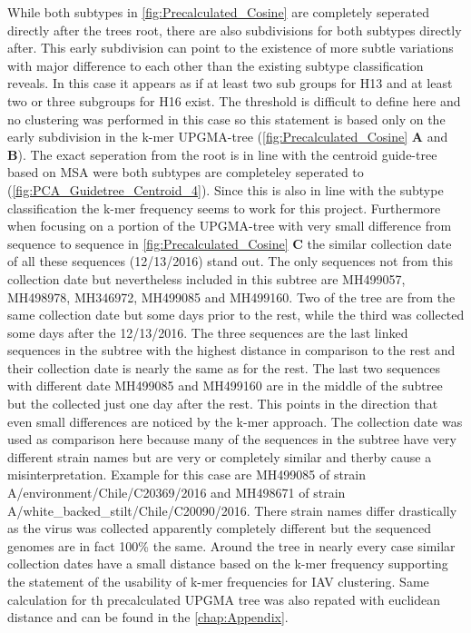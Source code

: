 While both subtypes in \autoref{fig:Precalculated_Cosine} are completely seperated directly after the trees root, there are also subdivisions for both subtypes directly after. This early subdivision can point to the existence of more subtle variations with major difference to each other than the existing subtype classification reveals. In this case it appears as if at least two sub groups for H13 and at least two or three subgroups for H16 exist. The threshold is difficult to define here and no clustering was performed in this case so this statement is based only on the early subdivision in the k-mer \gls{UPGMA}-tree (\autoref{fig:Precalculated_Cosine} \textbf{\textsf{A}} and \textbf{\textsf{B}}). The exact seperation from the root is in line with the centroid guide-tree based on \gls{MSA} were both subtypes are completeley seperated to (\autoref{fig:PCA_Guidetree_Centroid_4}). Since this is also in line with the subtype classification the k-mer frequency seems to work for this project. Furthermore when focusing on a portion of the \gls{UPGMA}-tree with very small difference from sequence to sequence in \autoref{fig:Precalculated_Cosine} \textbf{\textsf{C}} the similar collection date of all these sequences (12/13/2016) stand out. The only sequences not from this collection date but nevertheless included in this subtree are MH499057, MH498978, MH346972, MH499085 and MH499160. Two of the tree are from the same collection date but some days prior to the rest, while the third was collected some days after the 12/13/2016. The three sequences are the last linked sequences in the subtree with the highest distance in comparison to the rest and their collection date is nearly the same as for the rest. The last two sequences with different date MH499085 and MH499160 are in the middle of the subtree but the collected just one day after the rest. This points in the direction that even small differences are noticed by the k-mer approach. The collection date was used as comparison here because many of the sequences in the subtree have very different strain names but are very or completely similar and therby cause a misinterpretation. Example for this case are MH499085 of strain A/environment/Chile/C20369/2016 and MH498671 of strain A/white\_backed\_stilt/Chile/C20090/2016. There strain names differ drastically as the virus was collected apparently completely different but the sequenced genomes are in fact 100\% the same. Around the tree in nearly every case similar collection dates have a small distance based on the k-mer frequency supporting the statement of the usability of k-mer frequencies for \gls{IAV} clustering. Same calculation for th precalculated \gls{UPGMA} tree was also repated with euclidean distance and can be found in the \autoref{chap:Appendix}.

